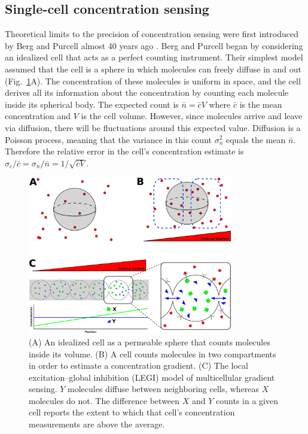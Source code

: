 \subsection{Single-cell concentration sensing}

Theoretical limits to the precision of concentration sensing were first introduced by Berg and Purcell almost 40 years ago \cite{berg1977physics}. Berg and Purcell began by considering an idealized cell that acts as a perfect counting instrument. Their simplest model assumed that the cell is a sphere in which molecules can freely diffuse in and out (Fig.\ \ref{sensing}A). The concentration of these molecules is uniform in space, and the cell derives all its information about the concentration by counting each molecule inside its spherical body. The expected count is
$\bar{n} = \bar{c}V$ where $\bar{c}$ is the mean concentration and $V$ is the cell volume.
However, since molecules arrive and leave via diffusion, there will be fluctuations around this expected value. Diffusion is a Poisson process, meaning that the variance in this count $\sigma_n^2$ equals the mean $\bar{n}$. Therefore the relative error in the cell's concentration estimate is
$\sigma_c/\bar{c} = \sigma_n/\bar{n} = 1/\sqrt{\bar{c} V}$.



\begin{figure}[ht]
    \centering
        \includegraphics[width=0.8\textwidth]{../fig/ch1_fig2.pdf}
    \caption{
    (A) An idealized cell as a permeable sphere that counts molecules inside its volume.
    (B) A cell counts molecules in two compartments in order to estimate a concentration gradient.
    (C) The local excitation--global inhibition (LEGI) model of multicellular gradient sensing. $Y$ molecules diffuse between neighboring cells, whereas $X$ molecules do not. The difference between $X$ and $Y$ counts in a given cell reports the extent to which that cell's concentration measurements are above the average.}
    \label{sensing}
\end{figure}



